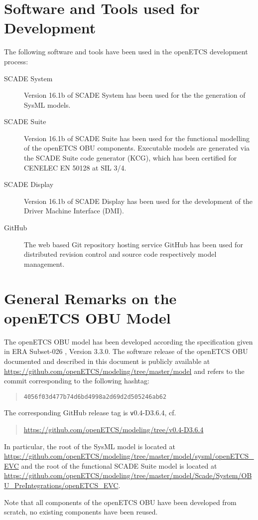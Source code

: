 \section{Software and Tools used for Development}

The following software and tools have been used in the openETCS development process:
\begin{description}
\item[SCADE System] Version 16.1b of SCADE System has been used for the the generation of SysML models.
\item[SCADE Suite] Version 16.1b of SCADE Suite has been used for the functional modelling of the openETCS OBU components. Executable models are generated via the SCADE Suite code generator (KCG), which has been certified for CENELEC EN 50128 at SIL 3/4.
\item[SCADE Display] Version 16.1b of SCADE Display has been used for the development of the Driver Machine Interface (DMI).
\item[GitHub] The web based Git repository hosting service GitHub has been used for distributed revision control and source code respectively model management.
\end{description}


\section{General Remarks on the openETCS OBU Model}

The openETCS OBU model has been developed according the specification given in ERA Subset-026 \cite{subset-026}, Version 3.3.0. The software release of the openETCS OBU documented and described in this document is publicly available at \url{https://github.com/openETCS/modeling/tree/master/model} and refers to the commit corresponding to the following hashtag:
\begin{quotation}
\centering
\texttt{4056f03d477b74d6bd4998a2d69d2d505246ab62}
\end{quotation}
The corresponding GitHub release tag is {\texttt v0.4-D3.6.4}, cf.
\begin{quotation}
\centering
\url{https://github.com/openETCS/modeling/tree/v0.4-D3.6.4}
\end{quotation}


In particular, the root of the SysML model is located at
\url{https://github.com/openETCS/modeling/tree/master/model/sysml/openETCS_EVC}
and the root of the functional SCADE Suite model is located at
\url{https://github.com/openETCS/modeling/tree/master/model/Scade/System/OBU_PreIntegrations/openETCS_EVC}.

Note that all components of the openETCS OBU have been developed from scratch, no existing components have been reused.